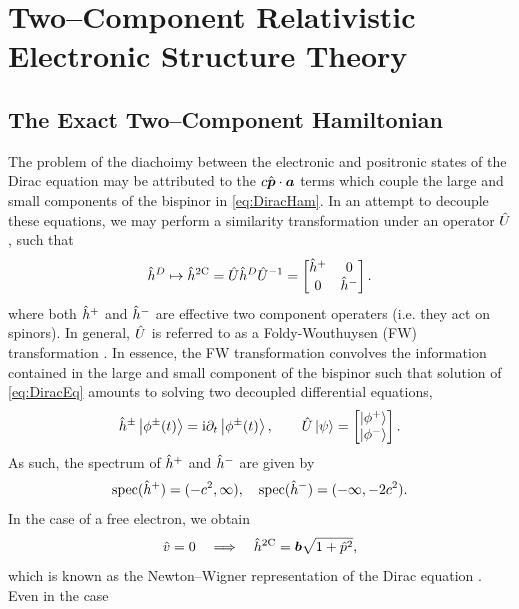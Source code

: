 \chapter{Two--Component Relativistic Electronic Structure Theory}
\label{eq:2CEST}


\section{The Exact Two--Component Hamiltonian}
\label{sec:X2C}

The problem of the diachoimy between the electronic and positronic states of the Dirac
equation may be attributed to the $c \hat{\boldsymbol{p}} \cdot \boldsymbol{a}$ terms which couple the 
large and small components of the bispinor in \cref{eq:DiracHam}. In an attempt
to decouple these equations, we may perform a similarity transformation under an operator $\hat{U}$, such that
\begin{equation}
\label{eq:FW}
\hat{h}^D \mapsto \hat{h}^{\mathrm{2C}}  = \hat{U} \hat{h}^D \hat{U}^{-1} = \begin{bmatrix} \hat{h}^+ & 0 \\ 0 & \hat{h}^- \end{bmatrix}.
\end{equation}
where both $\hat{h}^+$ and $\hat{h}^-$ are effective two component operaters (i.e. they act on spinors).
In general, $\hat{U}$ is referred to as a Foldy-Wouthuysen (FW) transformation .
In essence, the FW transformation convolves the information contained in the large and small
component of the bispinor such that solution of \cref{eq:DiracEq} amounts to solving two decoupled 
differential equations,
\begin{align}
\hat{h}^\pm \left\vert  \phi^\pm (t)  \right\rangle = \mathrm i \partial_t \left\vert \phi^\pm (t) \right\rangle, \qquad \hat{U} \left\vert \psi \right\rangle = \begin{bmatrix} \left\vert \phi^+ \right\rangle \\ \left\vert \phi^- \right\rangle \end{bmatrix}.
\end{align}
As such, the spectrum of $\hat{h}^+$ and $\hat{h}^-$ are given by
\begin{equation}
\mathrm{spec}(\hat{h}^+) = (-c^2,\infty), \quad 
\mathrm{spec}(\hat{h}^-) = (-\infty,-2c^2).
\end{equation}
In the case of a free electron, we obtain 
\begin{equation}
\label{eq:NWRep}
\hat{v} = 0 \quad \Longrightarrow \quad \hat{h}^{\mathrm{2C}} = \boldsymbol{b} \sqrt{1 + \hat{p}^2},
\end{equation}
which is known as the Newton--Wigner representation of the Dirac equation . Even in the case
